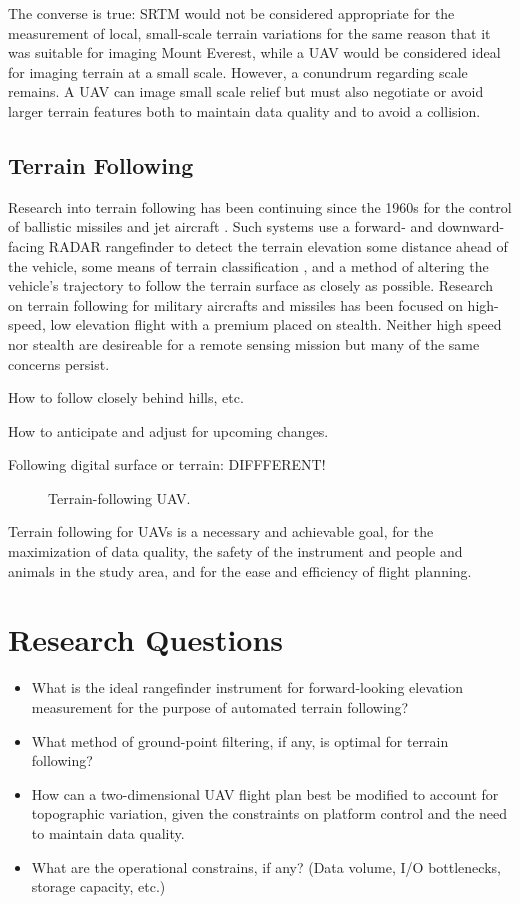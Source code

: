 \documentclass[10pt,a4paper]{report}
\begin{document}
The converse is true: SRTM would not be considered appropriate for the measurement of local, small-scale terrain variations for the same reason that it was suitable for imaging Mount Everest, while a UAV would be considered ideal for imaging terrain at a small scale. However, a conundrum regarding scale remains. A UAV can image small scale relief but must also negotiate or avoid larger terrain features both to maintain data quality and to avoid a collision.


\subsection{Terrain Following}

Research into terrain following has been continuing since the 1960s for the control of ballistic missiles and jet aircraft \cite{KRACHMALNICK1968,Starling1971,Cunningham1980}. Such systems use a forward- and downward-facing RADAR rangefinder to detect the terrain elevation some distance ahead of the vehicle, some means of terrain classification \cite{Cunningham1980}, and a method of altering the vehicle's trajectory to follow the terrain surface as closely as possible. Research on terrain following for military aircrafts and missiles has been focused on high-speed, low elevation flight with a premium placed on stealth. Neither high speed nor stealth are desireable for a remote sensing mission but many of the same concerns persist. 

How to follow closely behind hills, etc. 

How to anticipate and adjust for upcoming changes.

Following digital surface or terrain: DIFFFERENT!

\begin{figure}
\centering
\def\svgscale{0.5}

\caption{Terrain-following UAV.}
\label{fig:uav_terrain}
\end{figure}

Terrain following for UAVs is a necessary and achievable goal, for the maximization of data quality, the safety of the instrument and people and animals in the study area, and for the ease and efficiency of flight planning.

\section{Research Questions}

\begin{itemize}
\item What is the ideal rangefinder instrument for forward-looking elevation measurement for the purpose of automated terrain following?
\item What method of ground-point filtering, if any, is optimal for terrain following?
\item How can a two-dimensional UAV flight plan best be modified to account for topographic variation, given the constraints on platform control and the need to maintain data quality.
\item What are the operational constrains, if any? (Data volume, I/O bottlenecks, storage capacity, etc.)
\end{itemize}
\end{document}
